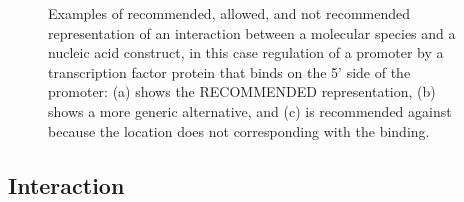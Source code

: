 \begin{enumerate}
{	\begin{figure}[h!]
	\centering
	\caption{Examples of recommended, allowed, and not recommended representation of an interaction between a molecular species and a nucleic acid construct, in this case regulation of a promoter by a transcription factor protein that binds on the 5' side of the promoter: 
	(a) shows the RECOMMENDED representation, (b) shows a more generic alternative, and (c) is recommended against because the location does not corresponding with the binding.}
	\label{exa:3}
	\end{figure}
	}

\end{enumerate}


\subsection{Interaction}

